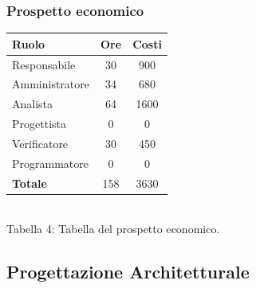 \subsubsection{Prospetto economico}
\begin{center}
\begin{tabular}{| l | c | c |}
\hline
Ruolo & Ore & Costi \\
\hline
Responsabile & 30 & 900 \\
Amministratore & 34 & 680 \\
Analista & 64 & 1600 \\
Progettista & 0 & 0 \\
Verificatore & 30 & 450 \\
Programmatore & 0 & 0 \\
\hline
\textbf{Totale} & 158 & 3630 \\
\hline
\end{tabular}
\\
	Tabella 4: Tabella del prospetto economico.
\end{center}
\subsection{Progettazione Architetturale}
